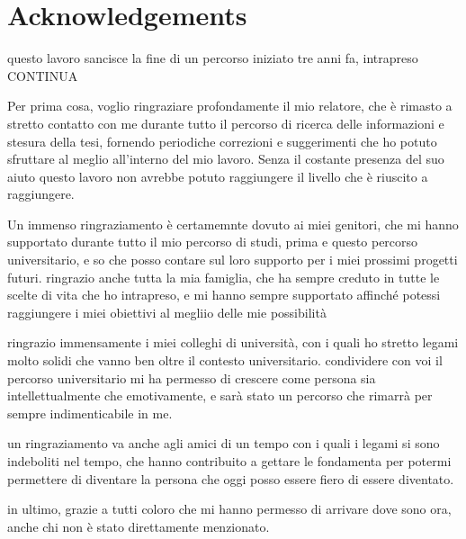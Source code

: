 \chapter*{Acknowledgements}


questo lavoro sancisce la fine di un percorso iniziato tre anni fa, intrapreso CONTINUA

Per prima cosa, voglio ringraziare profondamente il mio relatore, che è rimasto a stretto contatto con me durante tutto il percorso di ricerca delle informazioni e stesura della tesi, fornendo periodiche correzioni e suggerimenti che ho potuto sfruttare al meglio all'interno del mio lavoro. Senza il costante presenza del suo aiuto questo lavoro non avrebbe potuto raggiungere il livello che è riuscito a raggiungere.

Un immenso ringraziamento è certamemnte dovuto ai miei genitori, che mi hanno supportato durante tutto il mio percorso di studi, prima e questo percorso universitario, e so che posso contare sul loro supporto per i miei prossimi progetti futuri. ringrazio anche tutta la mia famiglia, che ha sempre creduto in tutte le scelte di vita che ho intrapreso, e mi hanno sempre supportato affinché potessi raggiungere i miei obiettivi al megliio delle mie possibilità

ringrazio immensamente i miei colleghi di università, con i quali ho stretto legami molto solidi che vanno ben oltre il contesto universitario. condividere con voi il percorso universitario mi ha permesso di crescere come persona sia intellettualmente che emotivamente, e sarà stato un percorso che rimarrà per sempre indimenticabile in me.

un ringraziamento va anche agli amici di un tempo con i quali i legami si sono indeboliti nel tempo, che hanno contribuito a gettare le fondamenta per potermi permettere di diventare la persona che oggi posso essere fiero di essere diventato.

in ultimo, grazie a tutti coloro che mi hanno permesso di arrivare dove sono ora, anche chi non è stato direttamente menzionato.

